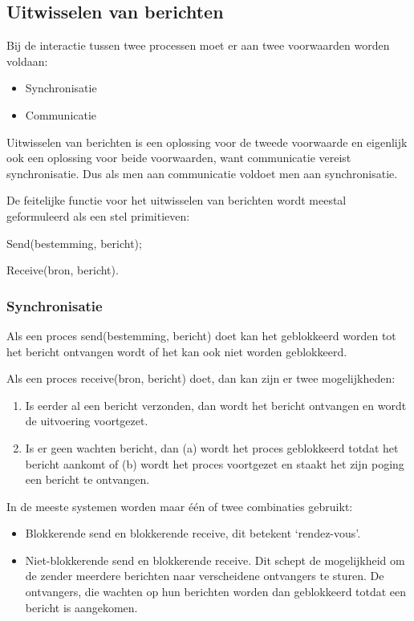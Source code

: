 \subsection{Uitwisselen van berichten}

Bij de interactie tussen twee processen moet er aan twee voorwaarden worden voldaan:

\begin{itemize}
\item Synchronisatie
\item Communicatie
\end{itemize}

Uitwisselen van berichten is een oplossing voor de tweede voorwaarde en eigenlijk ook een oplossing voor beide voorwaarden, want communicatie vereist synchronisatie. Dus als men aan communicatie voldoet men aan synchronisatie.

De feitelijke functie voor het uitwisselen van berichten wordt meestal geformuleerd als een stel primitieven:

Send(bestemming, bericht); 

Receive(bron, bericht).

\subsubsection{Synchronisatie}

Als een proces send(bestemming, bericht) doet kan het geblokkeerd worden tot het bericht ontvangen wordt of het kan ook niet worden geblokkeerd.

Als een proces receive(bron, bericht) doet, dan kan zijn er twee mogelijkheden:


\begin{enumerate}
\item Is eerder al een bericht verzonden, dan wordt het bericht ontvangen en wordt de uitvoering voortgezet.
\item Is er geen wachten bericht, dan (a) wordt het proces geblokkeerd totdat het bericht aankomt of (b) wordt het proces voortgezet en staakt het zijn poging een bericht te ontvangen.
\end{enumerate}

In de meeste systemen worden maar één of twee combinaties gebruikt:

\begin{itemize}
\item Blokkerende send en blokkerende receive, dit betekent ‘rendez-vous’.
\item Niet-blokkerende send en blokkerende receive. Dit schept de mogelijkheid om de zender meerdere berichten naar verscheidene ontvangers te sturen. De ontvangers, die wachten op hun berichten worden dan geblokkeerd totdat een bericht is aangekomen.
\end{itemize}

